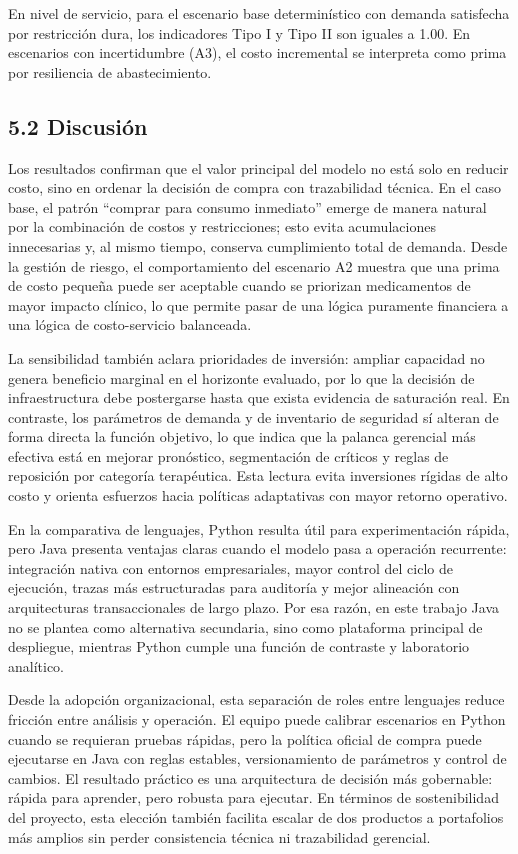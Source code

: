 \documentclass[12pt,letterpaper]{article}
\begin{document}
En nivel de servicio, para el escenario base determinístico con demanda satisfecha por restricción dura, los indicadores Tipo I y Tipo II son iguales a 1.00. En escenarios con incertidumbre (A3), el costo incremental se interpreta como prima por resiliencia de abastecimiento.

\subsection{5.2 Discusión}
Los resultados confirman que el valor principal del modelo no está solo en reducir costo, sino en ordenar la decisión de compra con trazabilidad técnica. En el caso base, el patrón ``comprar para consumo inmediato'' emerge de manera natural por la combinación de costos y restricciones; esto evita acumulaciones innecesarias y, al mismo tiempo, conserva cumplimiento total de demanda. Desde la gestión de riesgo, el comportamiento del escenario A2 muestra que una prima de costo pequeña puede ser aceptable cuando se priorizan medicamentos de mayor impacto clínico, lo que permite pasar de una lógica puramente financiera a una lógica de costo-servicio balanceada.

La sensibilidad también aclara prioridades de inversión: ampliar capacidad no genera beneficio marginal en el horizonte evaluado, por lo que la decisión de infraestructura debe postergarse hasta que exista evidencia de saturación real. En contraste, los parámetros de demanda y de inventario de seguridad sí alteran de forma directa la función objetivo, lo que indica que la palanca gerencial más efectiva está en mejorar pronóstico, segmentación de críticos y reglas de reposición por categoría terapéutica. Esta lectura evita inversiones rígidas de alto costo y orienta esfuerzos hacia políticas adaptativas con mayor retorno operativo.

En la comparativa de lenguajes, Python resulta útil para experimentación rápida, pero Java presenta ventajas claras cuando el modelo pasa a operación recurrente: integración nativa con entornos empresariales, mayor control del ciclo de ejecución, trazas más estructuradas para auditoría y mejor alineación con arquitecturas transaccionales de largo plazo. Por esa razón, en este trabajo Java no se plantea como alternativa secundaria, sino como plataforma principal de despliegue, mientras Python cumple una función de contraste y laboratorio analítico.

Desde la adopción organizacional, esta separación de roles entre lenguajes reduce fricción entre análisis y operación. El equipo puede calibrar escenarios en Python cuando se requieran pruebas rápidas, pero la política oficial de compra puede ejecutarse en Java con reglas estables, versionamiento de parámetros y control de cambios. El resultado práctico es una arquitectura de decisión más gobernable: rápida para aprender, pero robusta para ejecutar. En términos de sostenibilidad del proyecto, esta elección también facilita escalar de dos productos a portafolios más amplios sin perder consistencia técnica ni trazabilidad gerencial.
\end{document}
